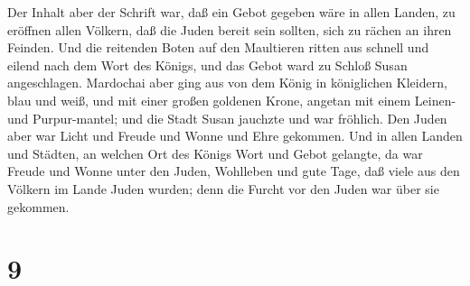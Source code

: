  Der Inhalt aber der Schrift war, daß ein Gebot gegeben
wäre in allen Landen, zu eröffnen allen Völkern, daß die Juden bereit
sein sollten, sich zu rächen an ihren Feinden.  Und die
reitenden Boten auf den Maultieren ritten aus schnell und eilend nach
dem Wort des Königs, und das Gebot ward zu Schloß Susan angeschlagen.
 Mardochai aber ging aus von dem König in königlichen
Kleidern, blau und weiß, und mit einer großen goldenen Krone, angetan
mit einem Leinen-und Purpur-mantel; und die Stadt Susan jauchzte und war
fröhlich.  Den Juden aber war Licht und Freude und Wonne
und Ehre gekommen.  Und in allen Landen und Städten, an
welchen Ort des Königs Wort und Gebot gelangte, da war Freude und Wonne
unter den Juden, Wohlleben und gute Tage, daß viele aus den Völkern im
Lande Juden wurden; denn die Furcht vor den Juden war über sie gekommen.

\hypertarget{section-8}{%
\section{9}\label{section-8}}

